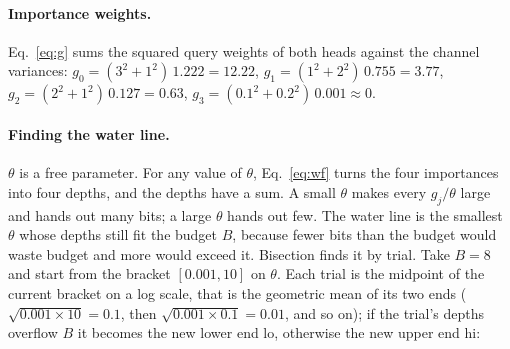 \documentclass[10pt,twocolumn]{article}
\begin{document}
\paragraph{Importance weights.} Eq.~\ref{eq:g} sums the squared query weights of both heads against the channel variances: $g_0 = (3^2+1^2)\,1.222 = 12.22$, $g_1 = (1^2+2^2)\,0.755 = 3.77$, $g_2 = (2^2+1^2)\,0.127 = 0.63$, $g_3 = (0.1^2+0.2^2)\,0.001 \approx 0$.

\paragraph{Finding the water line.} $\theta$ is a free parameter. For any value of $\theta$, Eq.~\ref{eq:wf} turns the four importances into four depths, and the depths have a sum. A small $\theta$ makes every $g_j/\theta$ large and hands out many bits; a large $\theta$ hands out few. The water line is the smallest $\theta$ whose depths still fit the budget $B$, because fewer bits than the budget would waste budget and more would exceed it. Bisection finds it by trial. Take $B=8$ and start from the bracket $[0.001, 10]$ on $\theta$. Each trial is the midpoint of the current bracket on a log scale, that is the geometric mean of its two ends ($\sqrt{0.001\times10}=0.1$, then $\sqrt{0.001\times0.1}=0.01$, and so on); if the trial's depths overflow $B$ it becomes the new lower end lo, otherwise the new upper end hi:
\begin{center}\setlength{\tabcolsep}{3pt}
\end{center}
\end{document}
